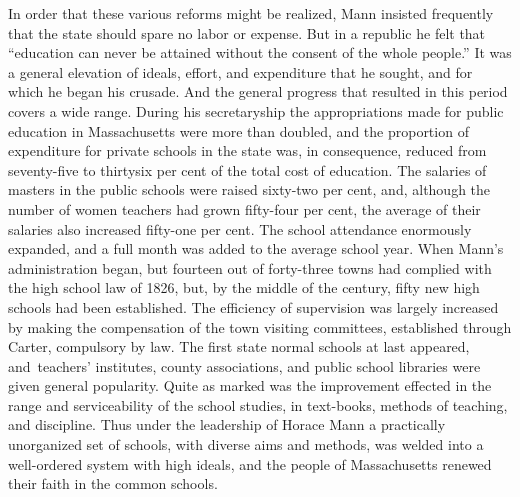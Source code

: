 \documentclass[
]{book}
\begin{document}
In order that these various reforms might be realized, Mann insisted frequently that the state should spare no labor or expense. But in a republic he felt that ``education can never be attained without the consent of the whole people.'' It was a general elevation of ideals, effort, and expenditure that he sought, and for which he began his crusade. And the general progress that resulted in this period covers a wide range. During his secretaryship the appropriations made for public education in Massachusetts were more than doubled, and the proportion of expenditure for private schools in the state was, in consequence, reduced from seventy-five to thirtysix per cent of the total cost of education. The salaries of masters in the public schools were raised sixty-two per cent, and, although the number of women teachers had grown fifty-four per cent, the average of their salaries also increased fifty-one per cent. The school attendance enormously expanded, and a full month was added to the average school year. When Mann's administration began, but fourteen out of forty-three towns had complied with the high school law of 1826, but, by the middle of the century, fifty new high schools had been established. The efficiency of supervision was largely increased by making the compensation of the town visiting committees, established through Carter, compulsory by law. The first state normal schools at last appeared, and~teachers' institutes, county associations, and public school libraries were given general popularity. Quite as marked was the improvement effected in the range and serviceability of the school studies, in text-books, methods of teaching, and discipline. Thus under the leadership of Horace Mann a practically unorganized set of schools, with diverse aims and methods, was welded into a well-ordered system with high ideals, and the people of Massachusetts renewed their faith in the common schools.
\end{document}
